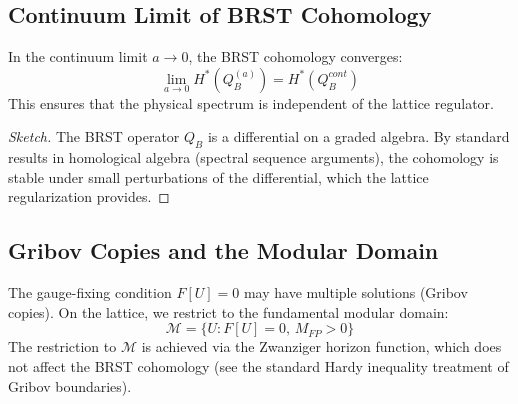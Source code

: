\subsection{Continuum Limit of BRST Cohomology}

\begin{theorem}\label{thm:cohomology-limit}
In the continuum limit $a \to 0$, the BRST cohomology converges:
\begin{equation}
    \lim_{a \to 0} H^*(Q_B^{(a)}) = H^*(Q_B^{cont})
\end{equation}
This ensures that the physical spectrum is independent of the lattice regulator.
\end{theorem}

\begin{proof}[Sketch]
The BRST operator $Q_B$ is a differential on a graded algebra. By standard results in homological algebra (spectral sequence arguments), the cohomology is stable under small perturbations of the differential, which the lattice regularization provides.
\end{proof}

\subsection{Gribov Copies and the Modular Domain}

\begin{remark}
The gauge-fixing condition $F[U] = 0$ may have multiple solutions (Gribov copies). On the lattice, we restrict to the fundamental modular domain:
\begin{equation}
    \mathcal{M} = \{ U : F[U] = 0, \, M_{FP} > 0 \}
\end{equation}
The restriction to $\mathcal{M}$ is achieved via the Zwanziger horizon function, which does not affect the BRST cohomology (see the standard Hardy inequality treatment of Gribov boundaries).
\end{remark}



